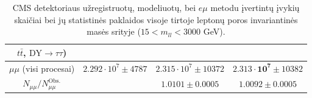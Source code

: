 \documentclass[a4paper, 12pt]{article}
\newcommand{\emu}{e\mu}
\newcommand{\mumu}{\mu\mu}
\newcommand{\DYtau}{\mathrm{DY} \! \rightarrow \! \tau\tau}
\begin{document}
\begin{centering}
\begin{table}
\begin{tabular}{|c|c|c|c|}
	$t\bar{t}$, $\DYtau$) & & & \\
	\hline
	
	\multirow{2}{8em}{\centering $\mumu$ (visi procesai)} &
	\multirow{2}{7em}{\centering $2.292 \cdot 10^7 \pm 4787$} &
	\multirow{2}{10em}{\centering $2.315 \cdot 10^7 \pm 10372$}
	&\multirow{2}{10em}{\centering $\mathbf{2.313 \cdot 10^7} \pm 10382$} \\
	
 	& & & \\
	\hline
	
	\multirow{2}{8em}{\centering $N_{\mumu}/N_{\mumu}^{\mathrm{Obs.}}$} &
	\multirow{2}{7em}{\centering 1} &
	\multirow{2}{10em}{\centering $1.0101 \pm 0.0005$} &
	\multirow{2}{10em}{\centering $1.0092 \pm 0.0005$} \\
	
 	& & & \\
	\hline
\end{tabular}
	\caption{\label{table:finalResults_Full} \small
	CMS detektoriaus užregistruotų, modeliuotų, bei $\emu$ metodu įvertintų įvykių skaičiai bei jų statistinės
	paklaidos visoje tirtoje leptonų poros invariantinės masės srityje ($15<m_{ll}<3000$ GeV).}
\end{table}
\end{centering}
\end{document}
